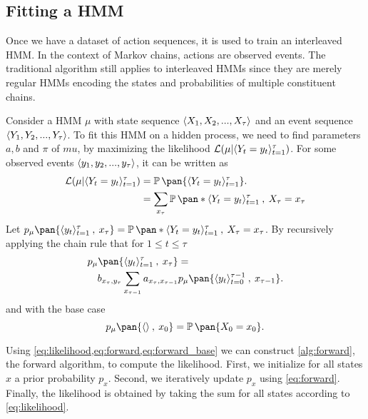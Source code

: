 \subsection{Fitting a HMM}

Once we have a dataset of action sequences, it is used to train an interleaved HMM. In the context of Markov chains, actions are observed events.
The traditional algorithm still applies to interleaved HMMs since they are merely regular HMMs encoding the states and probabilities of multiple constituent chains.

Consider a HMM \(\mu\) with state sequence \(\langle X_1, X_2, ..., X_\tau\rangle\) and an event sequence \(\langle Y_1, Y_2, ..., Y_\tau\rangle\). To fit this HMM on a hidden process, we need to find parameters \(a, b\) and \(\pi\) of \(mu\), by maximizing the likelihood \(\mathcal{L}(\mu | \langle Y_t = y_t\rangle_{t=1}^\tau)\). For some observed events \(\langle y_1, y_2, ..., y_\tau\rangle\), it can be written as
\begin{equation}\label{eq:likelihood}
    \begin{aligned}
        \mathcal{L}(\mu | \seq{Y_t = y_t}_{t=1}^\tau)
        &= \prob\pan{\seq{Y_t = y_t}_{t=1}^\tau}. \\
        &= \sum_{x_\tau} \prob\pan*{\seq{Y_t = y_t}_{t=1}^{\tau} \:,\: X_\tau = x_\tau}
    \end{aligned}
\end{equation}
Let \(p_\mu\pan{\seq{y_t}_{t=1}^{\tau} \:,\: x_\tau} = \prob\pan*{\seq{Y_t = y_t}_{t=1}^{\tau} \:,\: X_\tau = x_\tau}\).
By recursively applying the chain rule that for \(1
\leq t \leq \tau\)
\begin{equation}\label{eq:forward}
    \begin{multlined}
        p_\mu\pan{\seq{y_t}_{t=1}^{\tau} \:,\: x_\tau} = \\
        b_{x_\tau,y_\tau} \sum_{x_{\tau-1}} a_{x_{\tau}, x_{\tau-1}} p_\mu\pan{\seq{y_t}_{t=0}^{\tau-1}\:,\: x_{\tau-1}}.
    \end{multlined}
\end{equation}
and with the base case
\begin{equation}\label{eq:forward_base}
    p_\mu\pan{\seq{} \:,\: x_0} = \prob\pan{X_0 = x_0}.
\end{equation}

Using \cref{eq:likelihood,eq:forward,eq:forward_base} we can construct \cref{alg:forward}, the forward algorithm, to compute the likelihood. First, we initialize for all states \(x\) a prior probability \(p_x\). Second, we iteratively update \(p_x\) using \cref{eq:forward}. Finally, the likelihood is obtained by taking the sum for all states according to \cref{eq:likelihood}.

